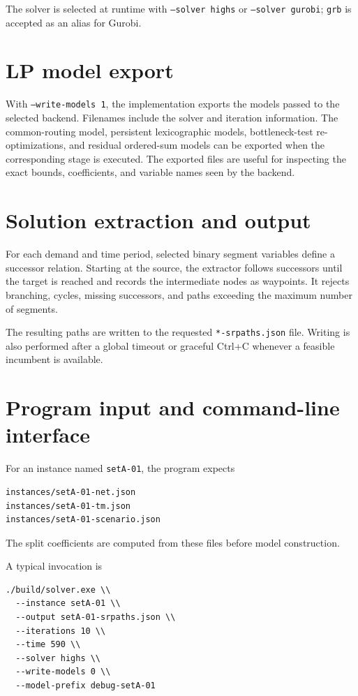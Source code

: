 \documentclass[11pt,a4paper]{article}
\begin{document}
The solver is selected at runtime with
\texttt{--solver highs} or \texttt{--solver gurobi}; \texttt{grb} is accepted as
an alias for Gurobi.

\section{LP model export}

With \texttt{--write-models 1}, the implementation exports the models passed to
the selected backend. Filenames include the solver and iteration information.
The common-routing model, persistent lexicographic models, bottleneck-test
re-optimizations, and residual ordered-sum models can be exported when the
corresponding stage is executed. The exported files are useful for inspecting
the exact bounds, coefficients, and variable names seen by the backend.

\section{Solution extraction and output}

For each demand and time period, selected binary segment variables define a
successor relation. Starting at the source, the extractor follows successors
until the target is reached and records the intermediate nodes as waypoints.
It rejects branching, cycles, missing successors, and paths exceeding the
maximum number of segments.

The resulting paths are written to the requested
\texttt{*-srpaths.json} file. Writing is also performed after a global timeout
or graceful Ctrl+C whenever a feasible incumbent is available.

\section{Program input and command-line interface}

For an instance named \texttt{setA-01}, the program expects
\begin{lstlisting}
instances/setA-01-net.json
instances/setA-01-tm.json
instances/setA-01-scenario.json
\end{lstlisting}
The split coefficients are computed from these files before model construction.

A typical invocation is
\begin{lstlisting}
./build/solver.exe \\
  --instance setA-01 \\
  --output setA-01-srpaths.json \\
  --iterations 10 \\
  --time 590 \\
  --solver highs \\
  --write-models 0 \\
  --model-prefix debug-setA-01
\end{lstlisting}
\end{document}
